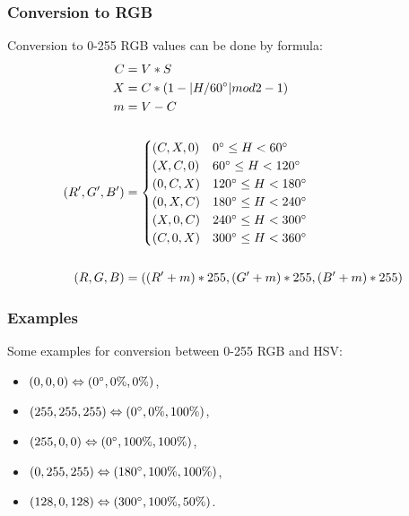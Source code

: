 \documentclass[titlepage]{article}
\begin{document}
\subsubsection{Conversion to RGB}
Conversion to 0-255 RGB values can be done by formula:
\begin{equation}
\begin{split}
C&=V*S\\
X&=C*(1-|H/60\degree|mod2-1)\\
m&=V-C\\
\\
(R', G', B')&=\begin{cases}
(C, X, 0) & 0\degree\leq H < 60\degree\\
(X, C, 0) & 60\degree\leq H < 120\degree\\
(0, C, X) & 120\degree\leq H<180\degree\\
(0, X, C) & 180\degree\leq H<240\degree\\
(X, 0, C) & 240\degree\leq H<300\degree\\
(C, 0, X) & 300\degree\leq H<360\degree
\end{cases}\\
\\
(R, G, B)&=((R'+m)*255, (G'+m)*255, (B'+m)*255)
\end{split}
\end{equation}

\subsubsection{Examples}
Some examples for conversion between 0-255 RGB and HSV:
\begin{itemize}
  \item $(0, 0, 0) \Leftrightarrow (0\degree, 0\%, 0\%)$,
  \item $(255, 255, 255) \Leftrightarrow (0\degree, 0\%, 100\%)$,
  \item $(255, 0, 0) \Leftrightarrow (0\degree, 100\%, 100\%)$,
  \item $(0, 255, 255) \Leftrightarrow (180\degree, 100\%, 100\%)$,
  \item $(128, 0, 128) \Leftrightarrow (300\degree, 100\%, 50\%)$.
\end{itemize}
\end{document}
